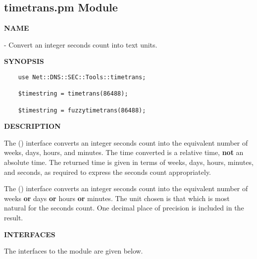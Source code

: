 \clearpage

\subsection{\bf timetrans.pm Module}

{\bf NAME}

 - Convert an integer seconds count into text units.

{\bf SYNOPSIS}

\begin{verbatim}
    use Net::DNS::SEC::Tools::timetrans;

    $timestring = timetrans(86488);

    $timestring = fuzzytimetrans(86488);
\end{verbatim}

{\bf DESCRIPTION}

The () interface converts an integer seconds count into the
equivalent number of weeks, days, hours, and minutes.  The time converted is a
relative time, {\bf not} an absolute time.  The returned time is given in
terms of weeks, days, hours, minutes, and seconds, as required to express the
seconds count appropriately.

The () interface converts an integer seconds count into
the equivalent number of weeks {\bf or} days {\bf or} hours {\bf or} minutes.
The unit chosen is that which is most natural for the seconds count.  One
decimal place of precision is included in the result.

{\bf INTERFACES}

The interfaces to the  module are given below.

